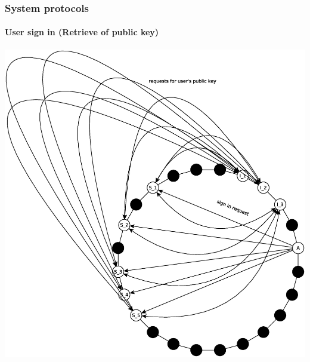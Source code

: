 \begin{frame}
\frametitle{System protocols}
\framesubtitle{User sign in (Retrieve of public key)}
\includegraphics[height=0.7\textheight]{../../img/sign_in_2}
\end{frame}

